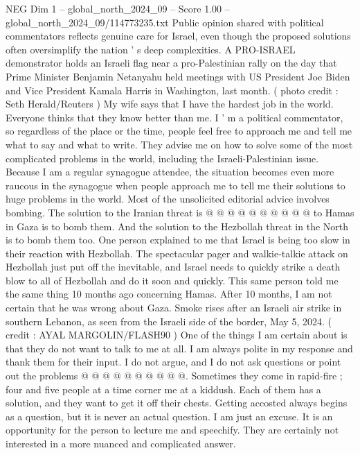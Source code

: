 \begin{textsample}{NEG Dim 1 – global\_north\_2024\_09 – Score 1.00 – global\_north\_2024\_09/114773235.txt}  \label{ex:f1_neg_024}
Public opinion shared with political commentators reflects genuine care for Israel, even though the proposed solutions often oversimplify the nation ' s deep complexities.
A PRO-ISRAEL demonstrator holds an Israeli flag near a pro-Palestinian rally on the day that Prime Minister Benjamin Netanyahu held meetings with US President Joe Biden and Vice President Kamala Harris in Washington, last month. ( photo credit : Seth Herald/Reuters ) My wife says that I have the hardest job in the world.
Everyone thinks that they know better than me.
I ' m a political commentator, so regardless of the place or the time, people feel free to approach me and tell me what to say and what to write.
They advise me on how to solve some of the most complicated problems in the world, including the Israeli-Palestinian issue.
Because I am a regular synagogue attendee, the situation becomes even more raucous in the synagogue when people approach me to tell me their solutions to huge problems in the world.
Most of the unsolicited editorial advice involves bombing.
The solution to the Iranian threat is @ @ @ @ @ @ @ @ @ @ to Hamas in Gaza is to bomb them.
And the solution to the Hezbollah threat in the North is to bomb them too.
One person explained to me that Israel is being too slow in their reaction with Hezbollah.
The spectacular pager and walkie-talkie attack on Hezbollah just put off the inevitable, and Israel needs to quickly strike a death blow to all of Hezbollah and do it soon and quickly.
This same person told me the same thing 10 months ago concerning Hamas.
After 10 months, I am not certain that he was wrong about Gaza.
Smoke rises after an Israeli air strike in southern Lebanon, as seen from the Israeli side of the border, May 5, 2024. ( credit : AYAL MARGOLIN/FLASH90 ) One of the things I am certain about is that they do not want to talk to me at all.
I am always polite in my response and thank them for their input.
I do not argue, and I do not ask questions or point out the problems @ @ @ @ @ @ @ @ @ @.
Sometimes they come in rapid-fire ; four and five people at a time corner me at a kiddush.
Each of them has a solution, and they want to get it off their chests.
Getting accosted always begins as a question, but it is never an actual question.
I am just an excuse.
It is an opportunity for the person to lecture me and speechify.
They are certainly not interested in a more nuanced and complicated answer.

\end{textsample}
